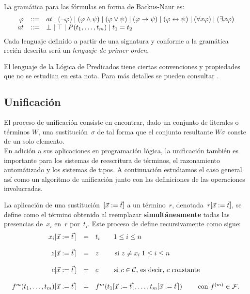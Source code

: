 \documentclass[11pt,letterpaper]{article}
\begin{document}
\noindent La gramática para las fórmulas en forma de Backus-Naur es:
\[
\begin{array}{rcl}
  \vp & ::= & at \mid (\neg\vp) \mid (\vp\land\psi) 
    \mid (\vp\lor\psi) \mid (\vp\imp\psi) \mid (\vp\iff\psi) 
    \mid (\fa x\vp) \mid (\ex x\vp) \\
  at & ::= & \bot \mid \top \mid P(t_1,\ldots,t_m) \mid t_1=t_2
\end{array}
\]
Cada lenguaje definido a partir de una signatura y conforme a la 
gram\'atica recién descrita será un \emph{lenguaje de primer orden}. 


\medskip

El lenguaje de la L\'ogica de Predicados tiene ciertas convenciones y propiedades que no se estudian en esta nota.
Para m\'as detalles se pueden consultar \cite{huth2004logic,schoening2009logic}.


\subsection{Unificaci\'on}
El proceso de unificaci\'on consiste en encontrar, dado un conjunto de 
literales o t\'erminos $W$, una sustitución~$\sigma$ de tal forma que el 
conjunto resultante $W\sigma$ conste de un solo elemento. \\
En adici\'on a sus aplicaciones en programaci\'on l\'ogica, la
unificaci\'on tambi\'en es importante para los sistemas de reescritura de
t\'erminos, el razonamiento autom\'atizado y los sistemas de tipos.
A continuación estudiamos el caso general así como un algoritmo de unificación 
junto con las definiciones de las operaciones involucradas.

\bigskip




La aplicación de una sustitución~$[\vx:=\vt]$ a un término~$r$,
denotada~$r[\vx:=\vt]$, se define como el término obtenido al reemplazar 
\textbf{simult\'aneamente} todas las presencias de~$x_i$ en~$r$ por~$t_i$. 
Este proceso de define  recursivamente como sigue:
\[
\ba{rll}
x_i[\vx:=\vt\,] & = & t_i \qquad  1\leq i\leq n \\ \\ 
z[\vx:=\vt\,] & = & z \qquad  \text{ si } z\neq x_i\;1\leq i\leq n  \\ \\
c[\vx:=\vt\,] & = & c \qquad 
  \text{ si } c\in\C\text{, es decir, }c\text{ constante } \\ \\
f^m(t_1,\ldots,t_m)[\vx:=\vt\,] & = & 
f^m(t_1[\vx:=\vt\,],\ldots,t_m[\vx:=\vt\,]) \qquad \text{ con }f^{(m)}\in\F.
\ea
\]
\end{document}
